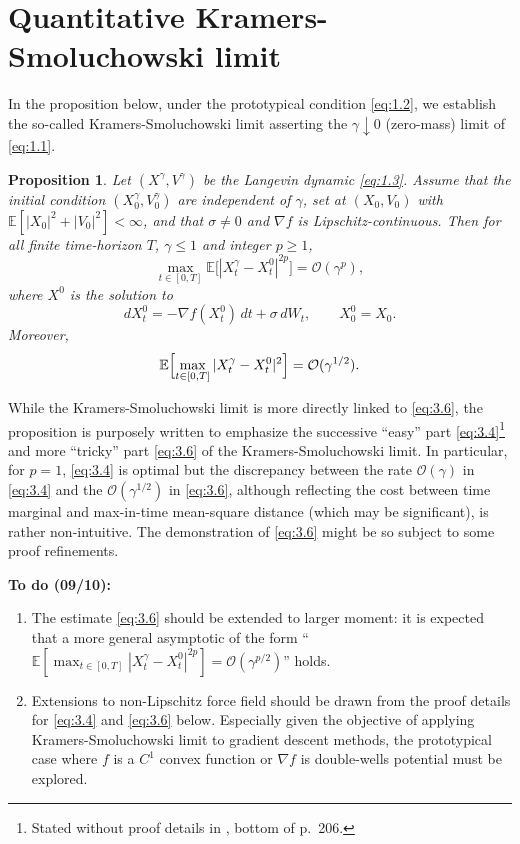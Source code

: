 \documentclass[11pt]{article}
\newtheorem{proposition}{Proposition}[section]
\theoremstyle{remark}
\begin{document}
\section{Quantitative Kramers-Smoluchowski limit}

In the proposition below, under the prototypical condition \eqref{eq:1.2}, we establish the so-called Kramers-Smoluchowski limit asserting the $\gamma\downarrow 0$ (zero-mass) limit of \eqref{eq:1.1}.

\begin{proposition}\label{prop:ks}
Let $(X^{\gamma},V^{\gamma})$ be the Langevin dynamic \eqref{eq:1.3}.
Assume that the initial condition $(X_0^{\gamma},V_0^{\gamma})$ are independent of $\gamma$, set at $(X_0,V_0)$ with $\mathbb{E}[|X_0|^2+|V_0|^2]<\infty$, and that $\sigma\neq 0$ and $\nabla f$ is Lipschitz-continuous.
Then for all finite time-horizon $T$, $\gamma\le 1$ and integer $p\ge1$,
\begin{equation}
\label{eq:3.4}
\max_{t\in[0,T]}\mathbb{E}\bigl[|X_t^{\gamma}-X_t^0|^{2p}\bigr]=\mathcal{O}(\gamma^p),
\end{equation}
where $X^0$ is the solution to
\begin{equation}
\label{eq:3.5}
dX_t^0=-\nabla f(X_t^0)\,dt+\sigma\,dW_t,\qquad X_0^0=X_0.
\end{equation}
Moreover,
\begin{equation}
\label{eq:3.6}
\mathbb{E}\Bigl[\max_{t\in[0,T]}|X_t^{\gamma}-X_t^0|^2\Bigr]=\mathcal{O}(\gamma^{1/2}).
\end{equation}
\end{proposition}

While the Kramers-Smoluchowski limit is more directly linked to \eqref{eq:3.6}, the proposition is purposely written to emphasize the successive ``easy'' part \eqref{eq:3.4}\footnote{Stated without proof details in \cite{p14}, bottom of p.~206.} and more ``tricky'' part \eqref{eq:3.6} of the Kramers-Smoluchowski limit.
In particular, for $p=1$, \eqref{eq:3.4} is optimal but the discrepancy between the rate $\mathcal{O}(\gamma)$ in \eqref{eq:3.4} and the $\mathcal{O}(\gamma^{1/2})$ in \eqref{eq:3.6}, although reflecting the cost between time marginal and max-in-time mean-square distance (which may be significant), is rather non-intuitive.
The demonstration of \eqref{eq:3.6} might be so subject to some proof refinements.

\textbf{To do (09/10):}
\begin{enumerate}
\item The estimate \eqref{eq:3.6} should be extended to larger moment: it is expected that a more general asymptotic of the form ``$\mathbb{E}[\max_{t\in[0,T]}|X_t^{\gamma}-X_t^0|^{2p}]=\mathcal{O}(\gamma^{p/2})$'' holds.
\item Extensions to non-Lipschitz force field should be drawn from the proof details for \eqref{eq:3.4} and \eqref{eq:3.6} below. Especially given the objective of applying Kramers-Smoluchowski limit to gradient descent methods, the prototypical case where $f$ is a $C^1$ convex function or $\nabla f$ is double-wells potential must be explored.
\end{enumerate}
\end{document}
